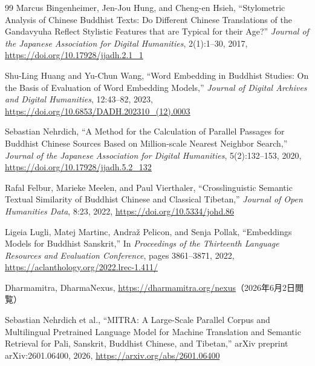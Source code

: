\documentclass[uplatex,dvipdfmx,11pt,a4paper]{jsarticle}
\begin{document}
\begin{thebibliography}{99}
Marcus Bingenheimer, Jen-Jou Hung, and Cheng-en Hsieh,
\newblock ``Stylometric Analysis of Chinese Buddhist Texts: Do Different Chinese Translations of the Gandavyuha Reflect Stylistic Features that are Typical for their Age?''
\newblock \textit{Journal of the Japanese Association for Digital Humanities}, 2(1):1--30, 2017,
\newblock \url{https://doi.org/10.17928/jjadh.2.1_1}

Shu-Ling Huang and Yu-Chun Wang,
\newblock ``Word Embedding in Buddhist Studies: On the Basis of Evaluation of Word Embedding Models,''
\newblock \textit{Journal of Digital Archives and Digital Humanities}, 12:43--82, 2023,
\newblock \url{https://doi.org/10.6853/DADH.202310_(12).0003}

Sebastian Nehrdich,
\newblock ``A Method for the Calculation of Parallel Passages for Buddhist Chinese Sources Based on Million-scale Nearest Neighbor Search,''
\newblock \textit{Journal of the Japanese Association for Digital Humanities}, 5(2):132--153, 2020,
\newblock \url{https://doi.org/10.17928/jjadh.5.2_132}

Rafal Felbur, Marieke Meelen, and Paul Vierthaler,
\newblock ``Crosslinguistic Semantic Textual Similarity of Buddhist Chinese and Classical Tibetan,''
\newblock \textit{Journal of Open Humanities Data}, 8:23, 2022,
\newblock \url{https://doi.org/10.5334/johd.86}

Ligeia Lugli, Matej Martinc, Andraž Pelicon, and Senja Pollak,
\newblock ``Embeddings Models for Buddhist Sanskrit,''
\newblock In \textit{Proceedings of the Thirteenth Language Resources and Evaluation Conference}, pages 3861--3871, 2022,
\newblock \url{https://aclanthology.org/2022.lrec-1.411/}

Dharmamitra,
\newblock DharmaNexus,
\newblock \url{https://dharmamitra.org/nexus}（2026年6月2日閲覧）

Sebastian Nehrdich et al.,
\newblock ``MITRA: A Large-Scale Parallel Corpus and Multilingual Pretrained Language Model for Machine Translation and Semantic Retrieval for Pali, Sanskrit, Buddhist Chinese, and Tibetan,''
\newblock arXiv preprint arXiv:2601.06400, 2026,
\newblock \url{https://arxiv.org/abs/2601.06400}

\end{thebibliography}
\end{document}
